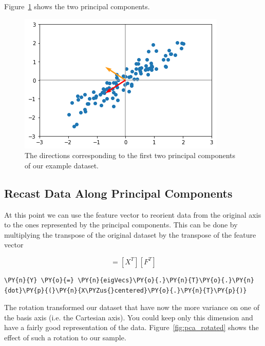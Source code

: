 Figure~\ref{fig:pca_result} shows the two principal components.

\begin{figure}[htb]
	\centering
	\includegraphics[width=0.7\linewidth]{figures/pca_result}
	\caption{The directions corresponding to the first two principal 
		components of our example dataset.}
	\label{fig:pca_result}
\end{figure}

\subsection{Recast Data Along Principal Components}
At this point we can use the feature vector to reorient data from the original axis to the ones represented by the principal components. 
This can be done by multiplying the transpose of the original dataset by the transpose of the feature vector

\begin{equation}
[Y] = [X^T][F^T]
\end{equation}

\begin{tcolorbox}[breakable, size=fbox, boxrule=1pt, pad at break*=1mm,colback=cellbackground, colframe=cellborder]
\begin{Verbatim}[commandchars=\\\{\}]
\PY{n}{Y} \PY{o}{=} \PY{n}{eigVecs}\PY{o}{.}\PY{n}{T}\PY{o}{.}\PY{n}{dot}\PY{p}{(}\PY{n}{X\PYZus{}centered}\PY{o}{.}\PY{n}{T}\PY{p}{)}
\end{Verbatim}
\end{tcolorbox}

The rotation transformed our dataset that have now the more
variance on one of the basis axis (i.e. the Cartesian axis). 
You could keep only this dimension
and have a fairly good representation of the data.
Figure~\ref{fig:pca_rotated} shows the effect of such a rotation to our
sample.

